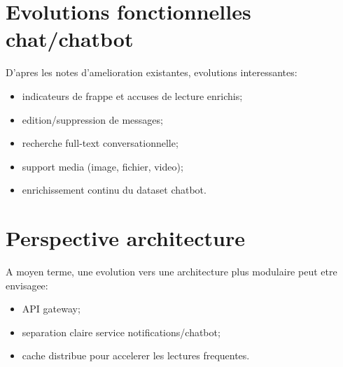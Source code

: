 \section{Evolutions fonctionnelles chat/chatbot}

D'apres les notes d'amelioration existantes, evolutions interessantes:
\begin{itemize}[leftmargin=*]
  \item indicateurs de frappe et accuses de lecture enrichis;
  \item edition/suppression de messages;
  \item recherche full-text conversationnelle;
  \item support media (image, fichier, video);
  \item enrichissement continu du dataset chatbot.
\end{itemize}

\section{Perspective architecture}

A moyen terme, une evolution vers une architecture plus modulaire peut etre envisagee:
\begin{itemize}[leftmargin=*]
  \item API gateway;
  \item separation claire service notifications/chatbot;
  \item cache distribue pour accelerer les lectures frequentes.
\end{itemize}

